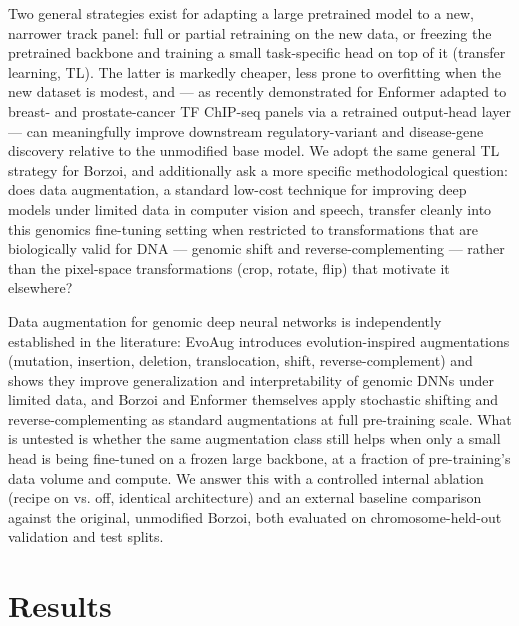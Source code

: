 \documentclass[10pt]{article}
\begin{document}
Two general strategies exist for adapting a large pretrained model to a new, narrower track panel: full or partial retraining on the new data, or freezing the pretrained backbone and training a small task-specific head on top of it (transfer learning, TL). The latter is markedly cheaper, less prone to overfitting when the new dataset is modest, and --- as recently demonstrated for Enformer adapted to breast- and prostate-cancer TF ChIP-seq panels via a retrained output-head layer \citep{plosgenetics2026} --- can meaningfully improve downstream regulatory-variant and disease-gene discovery relative to the unmodified base model. We adopt the same general TL strategy for Borzoi, and additionally ask a more specific methodological question: does data augmentation, a standard low-cost technique for improving deep models under limited data in computer vision and speech, transfer cleanly into this genomics fine-tuning setting when restricted to transformations that are biologically valid for DNA --- genomic shift and reverse-complementing --- rather than the pixel-space transformations (crop, rotate, flip) that motivate it elsewhere?

Data augmentation for genomic deep neural networks is independently established in the literature: EvoAug \citep{lee2023evoaug} introduces evolution-inspired augmentations (mutation, insertion, deletion, translocation, shift, reverse-complement) and shows they improve generalization and interpretability of genomic DNNs under limited data, and Borzoi and Enformer themselves apply stochastic shifting and reverse-complementing as standard augmentations at full pre-training scale. What is untested is whether the same augmentation class still helps when only a small head is being fine-tuned on a frozen large backbone, at a fraction of pre-training's data volume and compute. We answer this with a controlled internal ablation (recipe on vs. off, identical architecture) and an external baseline comparison against the original, unmodified Borzoi, both evaluated on chromosome-held-out validation and test splits.

\section*{Results}
\end{document}
